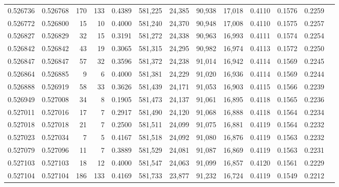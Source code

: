 \begin{tabular}{rrrrrrrrrrrrr}
0.526736 & 0.526768 &   170 &   133 &                                     0.4389 & 581,225 &  24,385 &  90,938 &  17,018 & 0.4110 & 0.1576 & 0.2259 \\
0.526772 & 0.526800 &    15 &    10 &                                     0.4000 & 581,240 &  24,370 &  90,948 &  17,008 & 0.4110 & 0.1575 & 0.2257 \\
0.526827 & 0.526829 &    32 &    15 &                                     0.3191 & 581,272 &  24,338 &  90,963 &  16,993 & 0.4111 & 0.1574 & 0.2254 \\
0.526842 & 0.526842 &    43 &    19 &                                     0.3065 & 581,315 &  24,295 &  90,982 &  16,974 & 0.4113 & 0.1572 & 0.2250 \\
0.526847 & 0.526847 &    57 &    32 &                                     0.3596 & 581,372 &  24,238 &  91,014 &  16,942 & 0.4114 & 0.1569 & 0.2245 \\
0.526864 & 0.526885 &     9 &     6 &                                     0.4000 & 581,381 &  24,229 &  91,020 &  16,936 & 0.4114 & 0.1569 & 0.2244 \\
0.526888 & 0.526919 &    58 &    33 &                                     0.3626 & 581,439 &  24,171 &  91,053 &  16,903 & 0.4115 & 0.1566 & 0.2239 \\
0.526949 & 0.527008 &    34 &     8 &                                     0.1905 & 581,473 &  24,137 &  91,061 &  16,895 & 0.4118 & 0.1565 & 0.2236 \\
0.527011 & 0.527016 &    17 &     7 &                                     0.2917 & 581,490 &  24,120 &  91,068 &  16,888 & 0.4118 & 0.1564 & 0.2234 \\
0.527018 & 0.527018 &    21 &     7 &                                     0.2500 & 581,511 &  24,099 &  91,075 &  16,881 & 0.4119 & 0.1564 & 0.2232 \\
0.527023 & 0.527034 &     7 &     5 &                                     0.4167 & 581,518 &  24,092 &  91,080 &  16,876 & 0.4119 & 0.1563 & 0.2232 \\
0.527079 & 0.527096 &    11 &     7 &                                     0.3889 & 581,529 &  24,081 &  91,087 &  16,869 & 0.4119 & 0.1563 & 0.2231 \\
0.527103 & 0.527103 &    18 &    12 &                                     0.4000 & 581,547 &  24,063 &  91,099 &  16,857 & 0.4120 & 0.1561 & 0.2229 \\
0.527104 & 0.527104 &   186 &   133 &                                     0.4169 & 581,733 &  23,877 &  91,232 &  16,724 & 0.4119 & 0.1549 & 0.2212 \\

\end{tabular}
